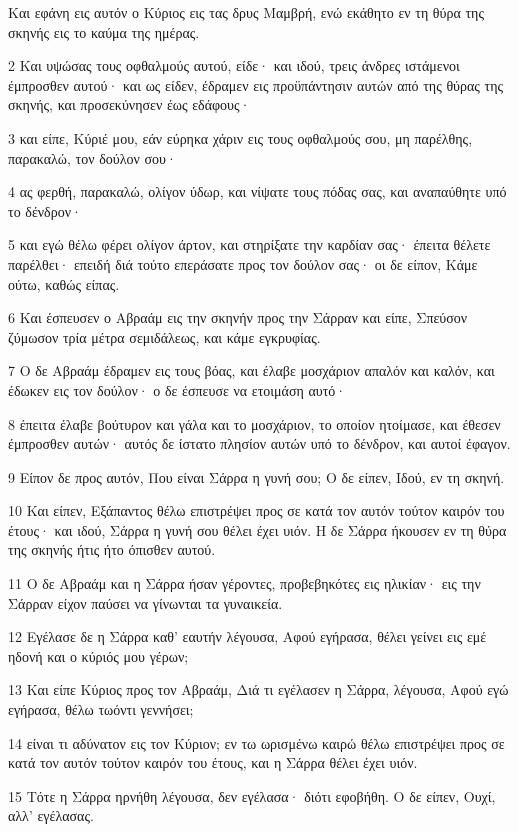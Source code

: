\par Και εφάνη εις αυτόν ο Κύριος εις τας δρυς Μαμβρή, ενώ εκάθητο εν τη θύρα της σκηνής εις το καύμα της ημέρας.
\par 2 Και υψώσας τους οφθαλμούς αυτού, είδε· και ιδού, τρεις άνδρες ιστάμενοι έμπροσθεν αυτού· και ως είδεν, έδραμεν εις προϋπάντησιν αυτών από της θύρας της σκηνής, και προσεκύνησεν έως εδάφους·
\par 3 και είπε, Κύριέ μου, εάν εύρηκα χάριν εις τους οφθαλμούς σου, μη παρέλθης, παρακαλώ, τον δούλον σου·
\par 4 ας φερθή, παρακαλώ, ολίγον ύδωρ, και νίψατε τους πόδας σας, και αναπαύθητε υπό το δένδρον·
\par 5 και εγώ θέλω φέρει ολίγον άρτον, και στηρίξατε την καρδίαν σας· έπειτα θέλετε παρέλθει· επειδή διά τούτο επεράσατε προς τον δούλον σας· οι δε είπον, Κάμε ούτω, καθώς είπας.
\par 6 Και έσπευσεν ο Αβραάμ εις την σκηνήν προς την Σάρραν και είπε, Σπεύσον ζύμωσον τρία μέτρα σεμιδάλεως, και κάμε εγκρυφίας.
\par 7 Ο δε Αβραάμ έδραμεν εις τους βόας, και έλαβε μοσχάριον απαλόν και καλόν, και έδωκεν εις τον δούλον· ο δε έσπευσε να ετοιμάση αυτό·
\par 8 έπειτα έλαβε βούτυρον και γάλα και το μοσχάριον, το οποίον ητοίμασε, και έθεσεν έμπροσθεν αυτών· αυτός δε ίστατο πλησίον αυτών υπό το δένδρον, και αυτοί έφαγον.
\par 9 Είπον δε προς αυτόν, Που είναι Σάρρα η γυνή σου; Ο δε είπεν, Ιδού, εν τη σκηνή.
\par 10 Και είπεν, Εξάπαντος θέλω επιστρέψει προς σε κατά τον αυτόν τούτον καιρόν του έτους· και ιδού, Σάρρα η γυνή σου θέλει έχει υιόν. Η δε Σάρρα ήκουσεν εν τη θύρα της σκηνής ήτις ήτο όπισθεν αυτού.
\par 11 Ο δε Αβραάμ και η Σάρρα ήσαν γέροντες, προβεβηκότες εις ηλικίαν· εις την Σάρραν είχον παύσει να γίνωνται τα γυναικεία.
\par 12 Εγέλασε δε η Σάρρα καθ' εαυτήν λέγουσα, Αφού εγήρασα, θέλει γείνει εις εμέ ηδονή και ο κύριός μου γέρων;
\par 13 Και είπε Κύριος προς τον Αβραάμ, Διά τι εγέλασεν η Σάρρα, λέγουσα, Αφού εγώ εγήρασα, θέλω τωόντι γεννήσει;
\par 14 είναι τι αδύνατον εις τον Κύριον; εν τω ωρισμένω καιρώ θέλω επιστρέψει προς σε κατά τον αυτόν τούτον καιρόν του έτους, και η Σάρρα θέλει έχει υιόν.
\par 15 Τότε η Σάρρα ηρνήθη λέγουσα, δεν εγέλασα· διότι εφοβήθη. Ο δε είπεν, Ουχί, αλλ' εγέλασας.
